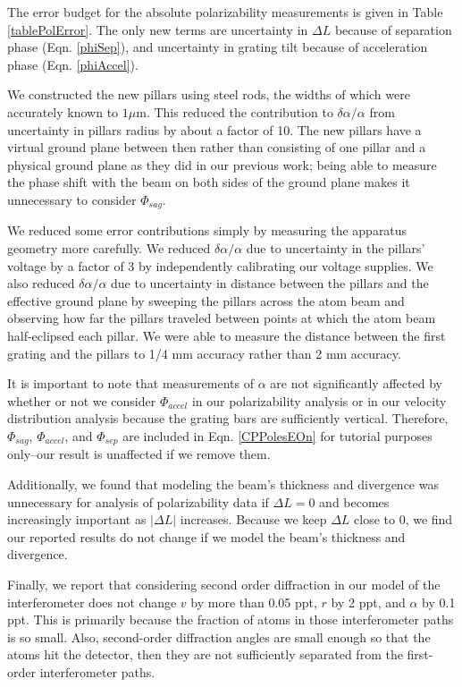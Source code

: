 \documentclass[twocolumn,prl,showpacs,superscriptaddress]{revtex4-1}   %
\newcommand{\eqnref}[1]{Eqn. \eqref{#1}}
\begin{document}
The error budget for the absolute polarizability measurements is given in Table \ref{tablePolError}. The only new terms are uncertainty in $\Delta L$ because of separation phase (\eqnref{phiSep}), and uncertainty in grating tilt because of acceleration phase (\eqnref{phiAccel}).

We constructed the new pillars using steel rods, the widths of which were accurately known to $1 \mu \text{m}$. This reduced the contribution to $\delta\alpha/\alpha$ from uncertainty in pillars radius by about a factor of 10. The new pillars have a virtual ground plane between then rather than consisting of one pillar and a physical ground plane as they did in our previous work; being able to measure the phase shift with the beam on both sides of the ground plane makes it unnecessary to consider $\Phi_{sag}$. 

We reduced some error contributions simply by measuring the apparatus geometry more carefully. We reduced $\delta\alpha/\alpha$ due to uncertainty in the pillars' voltage by a factor of 3 by independently calibrating our voltage supplies. We also reduced $\delta\alpha/\alpha$ due to uncertainty in distance between the pillars and the effective ground plane by sweeping the pillars across the atom beam and observing how far the pillars traveled between points at which the atom beam half-eclipsed each pillar. We were able to measure the distance between the first grating and the pillars to 1/4 mm accuracy rather than 2 mm accuracy. 

It is important to note that measurements of $\alpha$ are not significantly affected by whether or not we consider $\Phi_{accel}$ in our polarizability analysis or in our velocity distribution analysis because the grating bars are sufficiently vertical. Therefore, $\Phi_{sag}$, $\Phi_{accel}$, and $\Phi_{sep}$ are included in \eqnref{CPPolesEOn} for tutorial purposes only--our result is unaffected if we remove them.

Additionally, we found that modeling the beam's thickness and divergence was unnecessary for analysis of polarizability data if $\Delta L = 0$ and becomes increasingly important as $|\Delta L|$ increases. Because we keep $\Delta L$ close to 0, we find our reported results do not change if we model the beam's thickness and divergence.

Finally, we report that considering second order diffraction in our model of the interferometer does not change $v$ by more than 0.05 ppt, $r$ by 2 ppt, and $\alpha$ by 0.1 ppt. This is primarily because the fraction of atoms in those interferometer paths is so small. Also, second-order diffraction angles are small enough so that the atoms hit the detector, then they are not sufficiently separated from the first-order interferometer paths.
\end{document}
